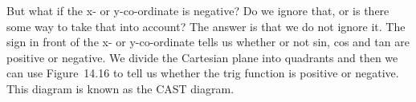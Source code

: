 \par \label{m39411*eip-169}\nopagebreak\noindent{}
    \label{m39411*eip-102}But what if the x- or y-co-ordinate is negative? Do we ignore that, or is there some way to take that into account? The answer is that we do not ignore it. The sign in front of the x- or y-co-ordinate tells us whether or not sin, cos and tan are positive or negative. We divide the Cartesian plane into quadrants and then we can use Figure~14.16 to tell us whether the trig function is positive or negative. This diagram is known as the CAST diagram.\par \label{m39411*eip-216}
    \setcounter{subfigure}{0}
